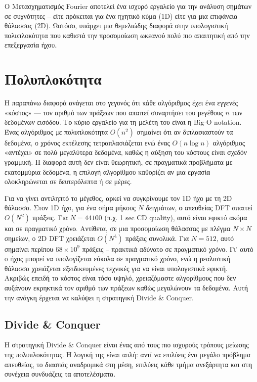 \documentclass[a4paper, 11pt]{article}
\begin{document}
Ο Μετασχηματισμός Fourier αποτελεί ένα ισχυρό εργαλείο για την ανάλυση
σημάτων σε συχνότητες -- είτε πρόκειται για ένα ηχητικό κύμα (1D) είτε
για μια επιφάνεια θάλασσας (2D). Ωστόσο, υπάρχει μια θεμελιώδης διαφορά
στην υπολογιστική πολυπλοκότητα που καθιστά την προσομοίωση ωκεανού πολύ
πιο απαιτητική από την επεξεργασία ήχου.

\section{Πολυπλοκότητα}\label{ux3c0ux3bfux3bbux3c5ux3c0ux3bbux3bfux3baux3ccux3c4ux3b7ux3c4ux3b1}

Η παραπάνω διαφορά ανάγεται στο γεγονός ότι κάθε αλγόριθμος έχει ένα
εγγενές «κόστος» --- τον αριθμό των πράξεων που απαιτεί συναρτήσει του
μεγέθους \(n\) των δεδομένων εισόδου. Το κύριο εργαλείο για τη μελέτη
του είναι η Big‑O notation. Ένας αλγόριθμος με πολυπλοκότητα \(O(n^2)\)
σημαίνει ότι αν διπλασιαστούν τα δεδομένα, ο χρόνος εκτέλεσης
τετραπλασιάζεται ενώ ένας \(O(n \log n)\) αλγόριθμος «αντέχει» σε πολύ
μεγαλύτερα δεδομένα, καθώς η αύξηση του κόστους είναι σχεδόν γραμμική. Η
διαφορά αυτή δεν είναι θεωρητική, σε πραγματικά προβλήματα με
εκατομμύρια δεδομένα, η επιλογή αλγορίθμου καθορίζει αν μια εργασία
ολοκληρώνεται σε δευτερόλεπτα ή σε μέρες.

Για να γίνει αντιληπτό το μέγεθος, αρκεί να συγκρίνουμε τον 1D ήχο με τη
2D θάλασσα. Στον 1D ήχο, για ένα σήμα μήκους \(N\) δειγμάτων, ο
απευθείας DFT απαιτεί \(O(N^2)\) πράξεις. Για \(N=44100\) (π.χ. 1 sec CD
quality), αυτό είναι εφικτό ακόμα και σε πραγματικό χρόνο. Αντίθετα, σε
μια προσομοίωση θάλασσας με πλέγμα \(N \times N\) σημείων, ο 2D DFT
χρειάζεται \(O(N^4)\) πράξεις συνολικά. Για \(N=512\), αυτό σημαίνει
περίπου \(68 \times 10^9\) πράξεις -- πρακτικά αδύνατο σε πραγματικό
χρόνο. Γι' αυτό ο ήχος μπορεί να υπολογίζεται εύκολα σε πραγματικό
χρόνο, ενώ η ρεαλιστική θάλασσα χρειάζεται εξειδικευμένες τεχνικές για
να είναι υπολογιστικά εφικτή. Ακριβώς επειδή το κόστος είναι τόσο υψηλό,
χρειαζόμαστε αλγορίθμους που δεν αυξάνουν εκρηκτικά τον αριθμό των
πράξεων καθώς μεγαλώνουν τα δεδομένα. Αυτή την ανάγκη έρχεται να καλύψει
η στρατηγική Divide \& Conquer.

\subsection{Divide \& Conquer}\label{divide-conquer}

Η στρατηγική Divide \& Conquer είναι ένας από τους πιο ισχυρούς τρόπους
μείωσης της πολυπλοκότητας. Η λογική της είναι απλή: αντί να επιλύεις
ένα μεγάλο πρόβλημα απευθείας, το διασπάς αναδρομικά στη μέση, επιλύεις
κάθε τμήμα ανεξάρτητα και στη συνέχεια συνδυάζεις τα αποτελέσματα.
\end{document}
